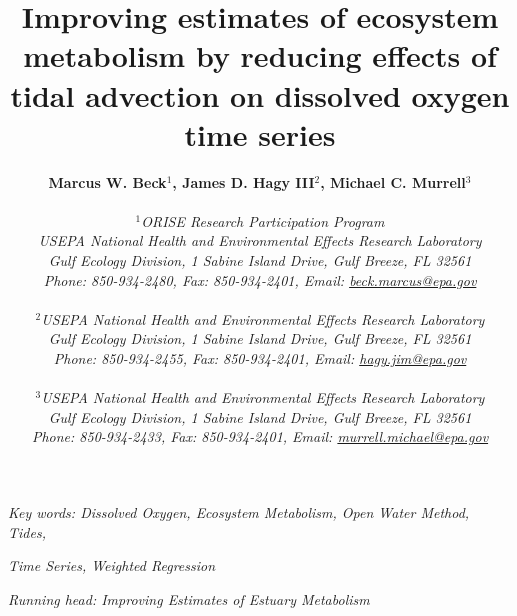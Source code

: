 \begin{singlespace}
\title{{\bf {\Large Improving estimates of ecosystem metabolism by reducing effects of tidal advection on dissolved oxygen time series}}}
\author{
  {\bf {\normalsize Marcus W. Beck$^1$, James D. Hagy III$^2$, Michael C. Murrell$^3$}}
  \\\\{\textit {\normalsize $^1$ORISE Research Participation Program}}
  \\{\textit {\normalsize USEPA National Health and Environmental Effects Research Laboratory}}
	\\{\textit {\normalsize Gulf Ecology Division, 1 Sabine Island Drive, Gulf Breeze, FL 32561}}
	\\{\textit {\normalsize Phone: 850-934-2480, Fax: 850-934-2401, Email: \href{mailto:beck.marcus@epa.gov}{beck.marcus@epa.gov}}}
  \\\\{\textit {\normalsize $^2$USEPA National Health and Environmental Effects Research Laboratory}}
  \\{\textit {\normalsize Gulf Ecology Division, 1 Sabine Island Drive, Gulf Breeze, FL 32561}}
	\\{\textit {\normalsize Phone: 850-934-2455, Fax: 850-934-2401, Email: \href{mailto:hagy.jim@epa.gov}{hagy.jim@epa.gov}}}
  \\\\{\textit {\normalsize $^3$USEPA National Health and Environmental Effects Research Laboratory}}
	\\{\textit {\normalsize Gulf Ecology Division, 1 Sabine Island Drive, Gulf Breeze, FL 32561}}
	\\{\textit {\normalsize Phone: 850-934-2433, Fax: 850-934-2401, Email: \href{mailto:murrell.michael@epa.gov}{murrell.michael@epa.gov}}}
	}
\date{}
\maketitle
\vfill
{\centerline{\it {\normalsize Key words: Dissolved Oxygen, Ecosystem Metabolism, Open Water Method, Tides,}}}
{\centerline{\it {\normalsize Time Series, Weighted Regression}}}
{\centerline{\it {\normalsize }}}
{\centerline{\it {\normalsize Running head: Improving Estimates of Estuary Metabolism}}}
\end{singlespace}
\clearpage